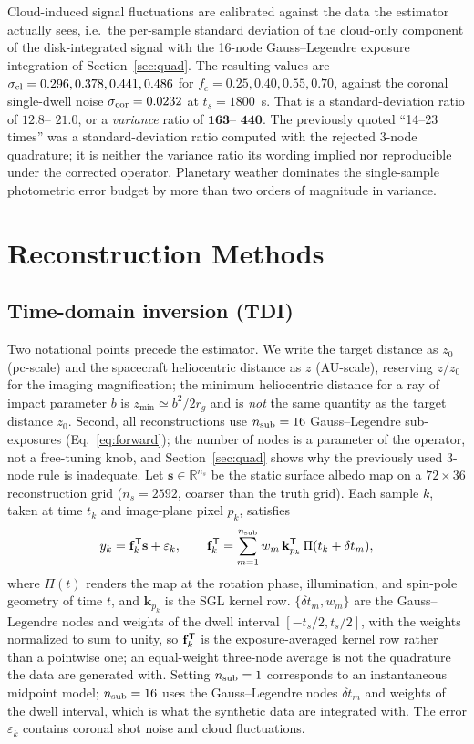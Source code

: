 \documentclass[twocolumn,10pt]{article}
\begin{document}
Cloud-induced signal fluctuations are calibrated against the data the
estimator actually sees, i.e.\ the per-sample standard deviation of the
cloud-only component of the disk-integrated signal with the 16-node
Gauss--Legendre exposure integration of Section~\ref{sec:quad}. The resulting
values are $\sigma_{\rm cl}=0.296,0.378,0.441,0.486$ for $f_c=0.25,0.40,0.55,
0.70$, against the coronal single-dwell noise $\sigma_{\rm cor}=0.0232$ at
$t_s=1800$~s. That is a standard-deviation ratio of $\mathbf{12.8}$--
$\mathbf{21.0}$, or a \emph{variance} ratio of $\mathbf{163}$--
$\mathbf{440}$. The previously quoted ``14--23 times'' was a standard-deviation
ratio computed with the rejected 3-node quadrature; it is neither the variance
ratio its wording implied nor reproducible under the corrected operator.
Planetary weather dominates the single-sample photometric error budget by more
than two orders of magnitude in variance.

\section{Reconstruction Methods}
\label{sec:methods}

\subsection{Time-domain inversion (TDI)}
\label{sec:tdi}
Two notational points precede the estimator. We write the target distance
as $z_0$ (pc-scale) and the spacecraft heliocentric distance as $z$ (AU-scale),
reserving $z/z_0$ for the imaging magnification; the minimum heliocentric
distance for a ray of impact parameter $b$ is $z_{\min}\simeq b^2/2r_g$ and is
\emph{not} the same quantity as the target distance $z_0$. Second, all
reconstructions use $n_{\rm sub}=16$ Gauss--Legendre sub-exposures (Eq.~\ref{eq:forward}); the number of nodes is a parameter of the operator, not a
free-tuning knob, and Section~\ref{sec:quad} shows why the previously used
3-node rule is inadequate.
Let $\mathbf{s}\in\mathbb{R}^{n_s}$ be the static surface albedo map on
a $72\times36$ reconstruction grid ($n_s=2592$, coarser than the truth grid).
Each sample $k$, taken at time $t_k$ and image-plane pixel $p_k$, satisfies
\begin{equation}
y_k=\mathbf{f}_k^{\sf T}\mathbf{s}+\varepsilon_k,\qquad
\mathbf{f}_k^{\sf T}=\sum_{m=1}^{n_{\rm sub}}w_m\,\mathbf{k}_{p_k}^{\sf T}\,\Pi(t_k+\delta t_m),
\label{eq:forward}
\end{equation}
where $\Pi(t)$ renders the map at the rotation phase, illumination, and
spin-pole geometry of time $t$, and $\mathbf{k}_{p_k}$ is the SGL kernel row.
$\{\delta t_m,w_m\}$ are the Gauss--Legendre nodes and weights of the dwell
interval $[-t_s/2,t_s/2]$, with the weights normalized to sum to unity, so
$\mathbf{f}_k^{\sf T}$ is the exposure-averaged kernel row rather than a
pointwise one; an equal-weight three-node average is not the quadrature the
data are generated with.
Setting $n_{\rm sub}=1$ corresponds to an instantaneous midpoint model;
$n_{\rm sub}=16$ uses the Gauss--Legendre nodes $\delta t_m$ and weights of
the dwell interval, which is what the synthetic data are integrated with.
The error $\varepsilon_k$ contains coronal shot noise and cloud fluctuations.
\end{document}
